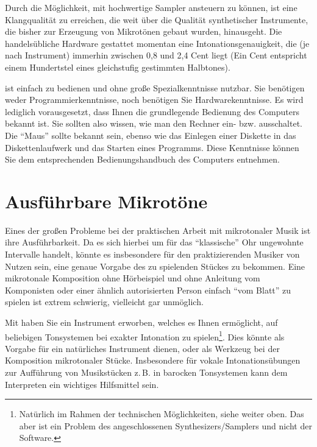 Durch die Möglichkeit, mit \mutabor{} hochwertige Sampler
ansteuern zu können, ist eine Klangqualität zu erreichen, die weit
über die Qualität synthetischer Instrumente, die bisher zur
Erzeugung von Mikrotönen gebaut wurden, hinausgeht. Die
handelsübliche Hardware gestattet momentan eine
Intonationsgenauigkeit, 
die (je nach Instrument) immerhin zwischen
0,8 und 2,4 Cent liegt (Ein Cent entspricht einem Hundertstel eines
gleichstufig gestimmten Halbtones).

\mutabor{} ist einfach zu bedienen und ohne große Spezialkenntnisse
nutzbar. Sie benötigen weder Programmierkenntnisse, noch benötigen Sie
Hardwarekenntnisse. Es wird lediglich vorausgesetzt, dass Ihnen die
grundlegende Bedienung des Computers bekannt ist. Sie sollten also
wissen, wie man den Rechner ein- bzw. ausschaltet. Die "`Maus"' sollte
bekannt sein, ebenso wie das Einlegen einer Diskette in das
Diskettenlaufwerk und das Starten eines Programms. Diese Kenntnisse
können Sie dem entsprechenden Bedienungshandbuch des Computers
entnehmen.

\section{Ausführbare Mikrotöne}\label{sec:ausf-mikr}
Eines der großen Probleme bei der praktischen Arbeit mit
mikrotonaler Musik ist ihre Ausführbarkeit. Da es sich hierbei um
für das "`klassische"' Ohr ungewohnte Intervalle handelt, könnte es
insbesondere für den praktizierenden Musiker von Nutzen sein, eine
genaue Vorgabe des zu spielenden Stückes zu bekommen. Eine
mikrotonale Komposition ohne Hörbeispiel und ohne Anleitung vom
Komponisten oder einer ähnlich autorisierten Person 
einfach  "`vom Blatt"' zu spielen ist extrem schwierig, 
vielleicht gar unmöglich.

Mit \mutabor{} haben Sie ein Instrument erworben,
welches es Ihnen er\-mög\-licht, auf beliebigen Tonsystemen bei
exakter Intonation zu spielen\footnote{Natürlich im Rahmen der
technischen Möglichkeiten, siehe weiter oben. Das aber ist ein
Problem des angeschlossenen Synthesizers/Samplers und nicht der
Software.}. Dies könnte als Vorgabe für ein natürliches Instrument
dienen, oder als Werkzeug bei der Komposition mikrotonaler Stücke.
Insbesondere für vokale Intonationsübungen zur Aufführung von
Musikstücken z.\,B. in barocken Tonsystemen kann \mutabor{} dem
Interpreten ein wichtiges Hilfsmittel sein.

